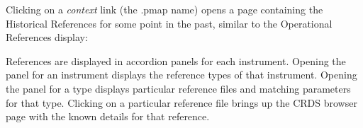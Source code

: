 \documentclass[letterpaper,10pt,english]{sphinxmanual}
\begin{document}
Clicking on a \emph{context} link (the .pmap name) opens a page containing the Historical References
for some point in the past,  similar to the Operational References display:
\begin{figure}[htbp]
\centering

\end{figure}

References are displayed in accordion panels for each instrument.   Opening the panel for
an instrument displays the reference types of that instrument.  Opening the panel for a type
displays particular reference files and matching parameters for that type.   Clicking on a particular
reference file brings up the CRDS browser page with the known details for that reference.
\end{document}
